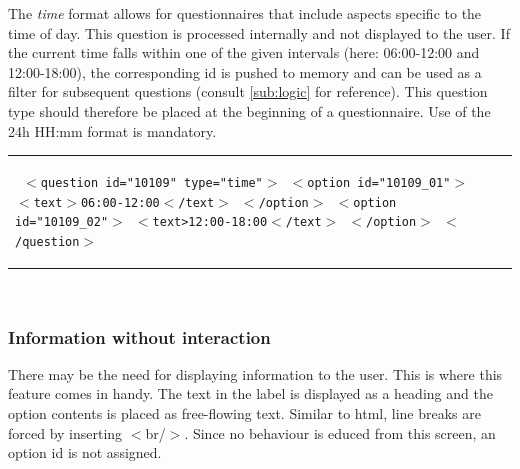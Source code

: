 \documentclass[11pt,a4paper,titlepage]{article}
\begin{document}
The \emph{time} format allows for questionnaires that include aspects specific to the time of day. This question is processed internally and not displayed to the user. If the current time falls within one of the given intervals (here: 06:00-12:00 and 12:00-18:00), the corresponding id is pushed to memory and can be used as a filter for subsequent questions (consult \ref{sub:logic} for reference). This question type should therefore be placed at the beginning of a questionnaire. Use of the 24h HH:mm format is mandatory.

\begin{center}
\hspace{-0.8cm}
\begin{tabular}{p{} p{}} 
		\begin{tcolorbox}[colback=black!10!white,colframe=black!50!white, boxsep=1pt,left=4pt,right=4pt,top=4pt,bottom=2pt]
		\texttt{\noindent
			$<$question id="10109" type="time"$>$\newline
			\hspace*{0.5cm}$<$option id="10109\_01"$>$\newline
			\hspace*{1.0cm}$<$text$>$06:00-12:00$<$/text$>$\newline
			\hspace*{0.5cm}$<$/option$>$\newline
			\hspace*{0.5cm}$<$option id="10109\_02"$>$\newline
			\hspace*{1.0cm}$<$text>12:00-18:00$<$/text$>$\newline
			\hspace*{0.5cm}$<$/option$>$\newline
			$<$/question$>$
			}
		\end{tcolorbox} 
		
		&
		
	\end{tabular}\\
\end{center}


\subsubsection{Information without interaction}

There may be the need for displaying information to the user. This is where this feature comes in handy. The text in the label is displayed as a heading and the option contents is placed as free-flowing text. Similar to html, line breaks are forced by inserting $<$br/$>$. Since no behaviour is educed from this screen, an option id is not assigned.
\end{document}
